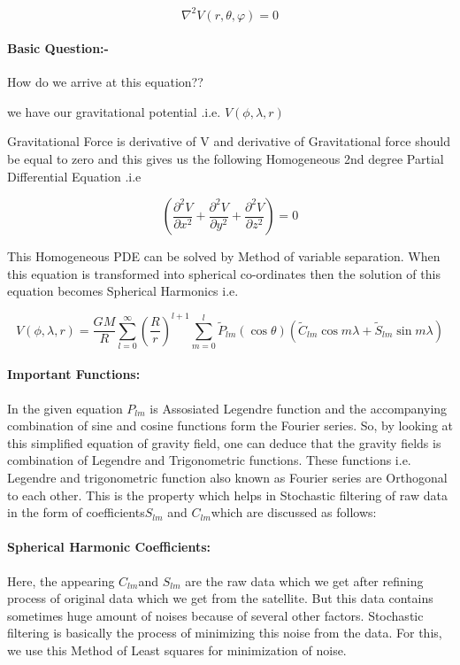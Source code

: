 \documentclass[a4paper,12pt]{report}
\begin{document}
\begin {equation}
\nabla ^2V(r,\theta ,\varphi) = 0
\end{equation}

\paragraph{Basic Question:-} How do we arrive at this equation??

we have our gravitational potential .i.e. $V(\phi,\lambda,r)$

Gravitational Force is derivative of V and derivative of Gravitational force should be equal to zero and this gives us the following Homogeneous 2nd degree Partial Differential Equation .i.e

   \[ \left( \frac{\partial^2 V}{\partial x^2}
      + \frac{\partial^2 V}{\partial y^2}
      + \frac{\partial^2 V}{\partial z^2} \right)=0 \]

This Homogeneous PDE  can be solved by Method of variable separation. When this equation is transformed into spherical co-ordinates then the solution of this equation becomes Spherical Harmonics i.e.

\begin{equation}
V(\phi,\lambda,r)=\frac{GM}{R}\sum_{l=0}^{\infty} \left(\frac{R}{r}\right)^{l+1}\sum_{m=0}^{l} \widetilde{P}_{lm}(\cos\theta)(\widetilde{C}_{lm}\cos m\lambda + \widetilde{S}_{lm}\sin m\lambda)
\end{equation}

\paragraph{Important Functions:} 
In the given equation $P_{lm}$ is Assosiated Legendre function and the accompanying combination of sine and cosine functions form the Fourier series. So, by looking at this simplified equation of gravity field, one can deduce that the gravity fields is combination of Legendre and Trigonometric functions.
These functions i.e. Legendre and trigonometric function also known as Fourier series are Orthogonal to each other. This is the property which helps in Stochastic filtering of raw data in the form of coefficients$ S_{lm}$ and $C_{lm} $which are discussed as follows:  
\paragraph{Spherical Harmonic Coefficients:} 
Here, the appearing $C_{lm}$and $S_{lm}$ are the raw data which we get after refining process of original data which we get from the satellite. But this data contains sometimes huge amount of noises because of several other factors. Stochastic filtering is basically the process of minimizing this noise from the data. For this, we use this Method of Least squares for minimization of noise.
\end{document}
